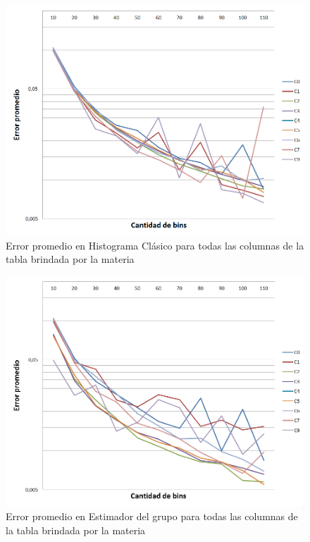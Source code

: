 \begin{figure}[H]
	    \includegraphics[scale=.44]{imagenes/variacion_parametro_y_columna_histo.png}
	    \caption{Error promedio en Histograma Cl\'asico para todas las columnas de la tabla brindada por la materia} 
	    \label{fig:variacion_parametro_y_columna_histo}
\end{figure}

\begin{figure}[H]
	    \includegraphics[scale=.44]{imagenes/variacion_parametro_y_columna_grupo.png}
	    \caption{Error promedio en Estimador del grupo para todas las columnas de la tabla brindada por la materia} 
	    \label{fig:variacion_parametro_y_columna_grupo}
\end{figure}

